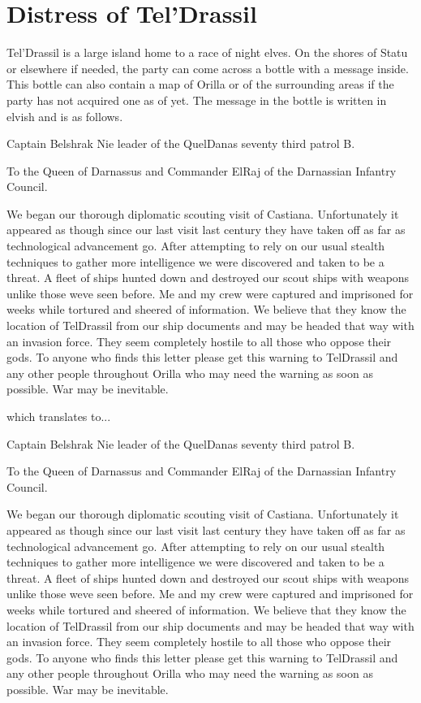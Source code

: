 \section{Distress of Tel'Drassil} \label{sec:Belshrak Nie}

Tel'Drassil is a large island home to a race of night elves. On the shores of Statu or elsewhere if needed, the party can come across a bottle with a message inside. This bottle can also contain a map of Orilla or of the surrounding areas if the party has not acquired one as of yet. The message in the bottle is written in elvish and is as follows. 


\begin{center}
	{ 
		Captain Belshrak Nie leader of the QuelDanas seventy third patrol B.
		
		To the Queen of Darnassus and Commander ElRaj of the Darnassian Infantry Council.
		
		We began our thorough diplomatic scouting visit of Castiana. Unfortunately it appeared as though since our last visit last century they have taken off as far as technological advancement go. After attempting to rely on our usual stealth techniques to gather more intelligence we were discovered and taken to be a threat. A fleet of ships hunted down and destroyed our scout ships with weapons unlike those weve seen before. Me and my crew were captured and imprisoned for weeks while tortured and sheered of information. We believe that they know the location of TelDrassil from our ship documents and may be headed that way with an invasion force. They seem completely hostile to all those who oppose their gods. To anyone who finds this letter please get this warning to TelDrassil and any other people throughout Orilla who may need the warning as soon as possible. War may be inevitable.
	}
\end{center}

which translates to...

\begin{center}
		Captain Belshrak Nie leader of the QuelDanas seventy third patrol B.
		
		To the Queen of Darnassus and Commander ElRaj of the Darnassian Infantry Council.
		
		We began our thorough diplomatic scouting visit of Castiana. Unfortunately it appeared as though since our last visit last century they have taken off as far as technological advancement go. After attempting to rely on our usual stealth techniques to gather more intelligence we were discovered and taken to be a threat. A fleet of ships hunted down and destroyed our scout ships with weapons unlike those weve seen before. Me and my crew were captured and imprisoned for weeks while tortured and sheered of information. We believe that they know the location of TelDrassil from our ship documents and may be headed that way with an invasion force. They seem completely hostile to all those who oppose their gods. To anyone who finds this letter please get this warning to TelDrassil and any other people throughout Orilla who may need the warning as soon as possible. War may be inevitable.
\end{center}

